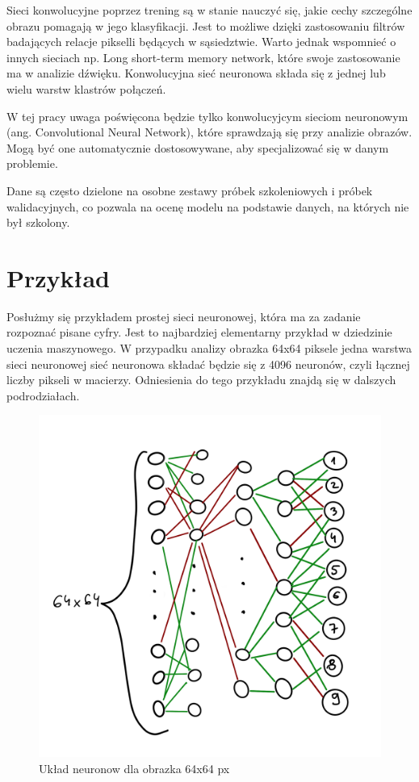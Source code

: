 \documentclass[brudnopis]{xmgr}
\begin{document}
Sieci konwolucyjne poprzez trening są w stanie nauczyć się, jakie cechy szczególne obrazu pomagają w jego klasyfikacji. Jest to możliwe dzięki zastosowaniu filtrów badających relacje pikselli będących w sąsiedztwie. Warto jednak wspomnieć o innych sieciach np. Long short-term memory network, które swoje zastosowanie ma w analizie dźwięku. Konwolucyjna sieć neuronowa składa się z jednej lub wielu warstw klastrów połączeń.

W tej pracy uwaga poświęcona będzie tylko konwolucyjcym sieciom neuronowym (ang. Convolutional Neural Network), które sprawdzają się przy analizie obrazów.  Mogą być one automatycznie dostosowywane, aby specjalizować się w danym problemie.

Dane są często dzielone na osobne zestawy próbek szkoleniowych i próbek walidacyjnych, co pozwala na ocenę modelu na podstawie danych, na których nie był szkolony.



\section{Przykład  \label{s:dsssl}}

Posłużmy się przykładem prostej sieci neuronowej, która ma za zadanie rozpoznać pisane cyfry. Jest to najbardziej elementarny przykład w dziedzinie uczenia maszynowego.
W przypadku analizy obrazka 64x64 piksele jedna warstwa sieci neuronowej sieć neuronowa składać będzie się z 4096 neuronów, czyli łącznej liczby pikseli w macierzy. Odniesienia do tego przykładu znajdą się w dalszych podrodziałach.

\begin{figure}[!tbh]
\centering
\includegraphics[width=.8\hsize]{fig/2}
\caption{Układ neuronow dla obrazka 64x64 px\label{RYS.2}}
\end{figure}
\end{document}
